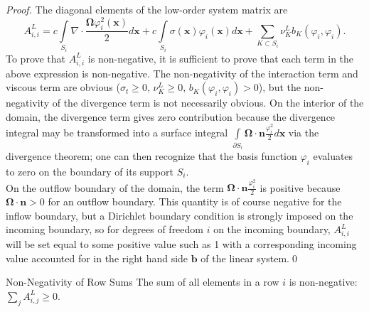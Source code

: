 \begin{proof}
The diagonal elements of the low-order system matrix are
\[
	A^L_{i,i} = c\int\limits_{S_{i}}\nabla\cdot
   \frac{\mathbf{\Omega}\varphi_i^2(\mathbf{x})}{2} d\mathbf{x} 
      + c\int\limits_{S_{i}}\sigma(\mathbf{x})\varphi_i(\mathbf{x})d\mathbf{x} +
		\sum\limits_{K\subset S_{i}}\nu_K^L b_K(\varphi_i, \varphi_i).
\]
To prove that $A^L_{i,i}$ is non-negative, it is sufficient to prove that
each term in the above expression is non-negative. The non-negativity of
the interaction term and viscous term are obvious ($\sigma_t \ge 0, 
\, \nu_K^L\ge 0, \, b_K(\varphi_i, \varphi_i)>0$), but
the non-negativity of the divergence term is not necessarily obvious. On the interior of
the domain, the divergence term gives zero contribution because the divergence integral may
be transformed into a surface integral $\int\limits_{\partial S_{i}}
\mathbf{\Omega}\cdot\mathbf{n}\frac{\varphi_i^2}{2} d\mathbf{x}$
via the divergence theorem; one can then recognize that
the basis function $\varphi_i$ evaluates to zero on the boundary of its support $S_{i}$.\\
On the outflow boundary of the domain, the term $\mathbf{\Omega}\cdot\mathbf{n}
\frac{\varphi_i^2}{2}$ is positive because $\mathbf{\Omega}\cdot\mathbf{n} >0$
for an outflow boundary. This quantity is of course negative for the inflow boundary,
but a Dirichlet boundary condition is strongly imposed on the incoming boundary, so
for degrees of freedom $i$ on the incoming boundary, $A^L_{i,i}$ will be set equal
to some positive value such as 1 with a corresponding incoming value
accounted for in the right hand side $\mathbf{b}$ of the linear system.\qed
\end{proof}
\begin{lemma}{Non-Negativity of Row Sums}
   The sum of all elements in a row $i$ is non-negative: $\sum\limits_j A^L_{i,j} \ge 0$.
\end{lemma}

